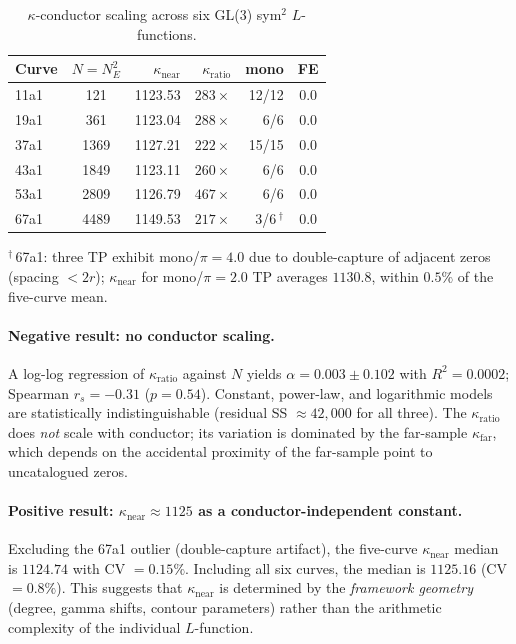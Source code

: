 \documentclass[11pt, a4paper]{article}
\theoremstyle{definition}
\theoremstyle{plain}
\begin{document}
\begin{table}[ht]
\centering
\caption{$\kappa$-conductor scaling across six GL(3) sym$^2$ $L$-functions.
\label{tab:gl3_kappa_scaling}}
\smallskip
\begin{tabular}{lcrrrc}
\toprule
Curve & $N = N_E^2$ & $\kappa_{\mathrm{near}}$ & $\kappa_{\mathrm{ratio}}$ & mono & FE \\
\midrule
11a1 & 121   & 1123.53 & $283\times$ & 12/12 & 0.0 \\
19a1 & 361   & 1123.04 & $288\times$ & 6/6   & 0.0 \\
37a1 & 1369  & 1127.21 & $222\times$ & 15/15 & 0.0 \\
43a1 & 1849  & 1123.11 & $260\times$ & 6/6   & 0.0 \\
53a1 & 2809  & 1126.79 & $467\times$ & 6/6   & 0.0 \\
67a1 & 4489  & 1149.53 & $217\times$ & 3/6\,${}^\dagger$  & 0.0 \\
\bottomrule
\end{tabular}

\medskip\noindent
{\footnotesize ${}^\dagger$\,67a1: three TP exhibit mono/$\pi = 4.0$ due to
double-capture of adjacent zeros (spacing $< 2r$); $\kappa_{\mathrm{near}}$
for mono/$\pi = 2.0$ TP averages $1130.8$, within $0.5\%$ of the five-curve
mean.}
\end{table}

\paragraph{Negative result: no conductor scaling.}
A log-log regression of $\kappa_{\mathrm{ratio}}$ against $N$ yields
$\alpha = 0.003 \pm 0.102$ with $R^2 = 0.0002$; Spearman $r_s = -0.31$
($p = 0.54$).  Constant, power-law, and logarithmic models are statistically
indistinguishable (residual SS $\approx 42{,}000$ for all three).  The
$\kappa_{\mathrm{ratio}}$ does \emph{not} scale with conductor; its variation
is dominated by the far-sample $\kappa_{\mathrm{far}}$, which depends on the
accidental proximity of the far-sample point to uncatalogued zeros.

\paragraph{Positive result: $\kappa_{\mathrm{near}} \approx 1125$ as a
conductor-independent constant.}
Excluding the 67a1 outlier (double-capture artifact), the five-curve
$\kappa_{\mathrm{near}}$ median is $\mathbf{1124.74}$ with CV $= 0.15\%$.
Including all six curves, the median is $1125.16$ (CV $= 0.8\%$).  This
suggests that $\kappa_{\mathrm{near}}$ is determined by the
\emph{framework geometry} (degree, gamma shifts, contour parameters) rather
than the arithmetic complexity of the individual $L$-function.
\end{document}
